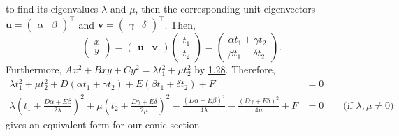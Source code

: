 \documentclass[../Notes.tex]{subfiles}
\begin{document}
to find its eigenvalues \(\lambda\) and \(\mu\), then the corresponding unit eigenvectors \(\mathbf{u}=
\begin{pmatrix}
    \alpha & \beta
\end{pmatrix}^\top\) and \(\mathbf{v}=
\begin{pmatrix}
    \gamma & \delta
\end{pmatrix}^\top\). Then,
\[\begin{pmatrix}
    x\\
    y
\end{pmatrix}=
\begin{pmatrix}
    \mathbf{u} & \mathbf{v}
\end{pmatrix}
\begin{pmatrix}
    t_1\\
    t_2
\end{pmatrix}=
\begin{pmatrix}
    \alpha t_1+\gamma t_2\\
    \beta t_1+\delta t_2
\end{pmatrix}.\]
Furthermore, \(Ax^2+Bxy+Cy^2=\lambda t_1^2+\mu t_2^2\) by \hyperlink{thm:quadratic-forms-real}{1.28}. Therefore, 
\begin{align*}
    \lambda t_1^2+\mu t_2^2+D(\alpha t_1+\gamma t_2)+E(\beta t_1+\delta t_2)+F&=0\\
    \lambda\left( t_1+\frac{D\alpha+E\beta}{2\lambda} \right)^2+\mu\left( t_2+\frac{D\gamma+E\delta}{2\mu} \right)^2-\frac{(D\alpha+E\beta)^2}{4\lambda}-\frac{(D\gamma+E\delta)^2}{4\mu}+F&=0 \qquad\text{(if \(\lambda,\mu\neq 0\))}
\end{align*}
gives an equivalent form for our conic section. 
\end{document}
